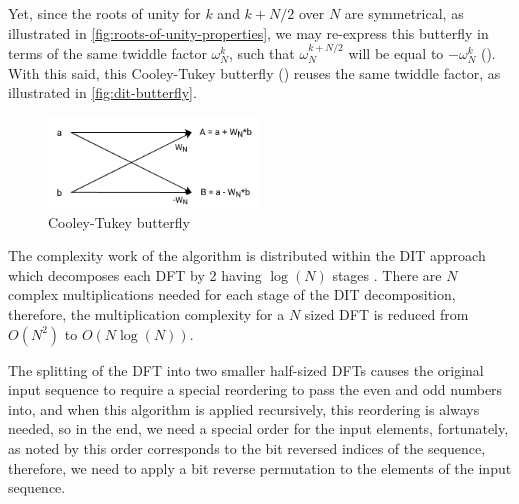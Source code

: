 \documentclass[
  oneside,
  11pt, a4paper,
  footinclude=true,
  headinclude=true,
  cleardoublepage=empty
]{scrbook}
\begin{document}
Yet, since the roots of unity for $k$ and $k+N/2$ over $N$ are symmetrical, as illustrated in \autoref{fig:roots-of-unity-properties}, we may re-express this butterfly in terms of the same twiddle factor $\omega_{N}^{k}$, such that $\omega_{N}^{k+N/2}$ will be equal to $-\omega_{N}^{k}$ (\cite{jones2014digital}). With this said, this Cooley-Tukey butterfly (\cite{chu1999inside}) reuses the same twiddle factor, as illustrated in \autoref{fig:dit-butterfly}.


\begin{figure}[H] 
    \centering
    \includegraphics[width=0.5\textwidth]{img/dit_butterfly.png}
    \caption{Cooley-Tukey butterfly}
    \label{fig:dit-butterfly}
\end{figure}


The complexity work of the algorithm is distributed within the DIT approach which decomposes each DFT by 2 having \(\log{(N)}\) stages \cite{smith2007mathematics}. There are $N$ complex multiplications needed for each stage of the DIT decomposition, therefore, the multiplication complexity for a $N$ sized DFT is reduced from $O(N^{2})$ to $O(N \log{(N)})$.
\newline


The splitting of the DFT into two smaller half-sized DFTs causes the original input sequence to require a special reordering to pass the even and odd numbers into, and when this algorithm is applied recursively, this reordering is always needed, so in the end, we need a special order for the input elements, fortunately, as noted by \cite{thong1981algebraic} this order corresponds to the bit reversed indices of the sequence, therefore, we need to apply a bit reverse permutation to the elements of the input sequence.
\end{document}
